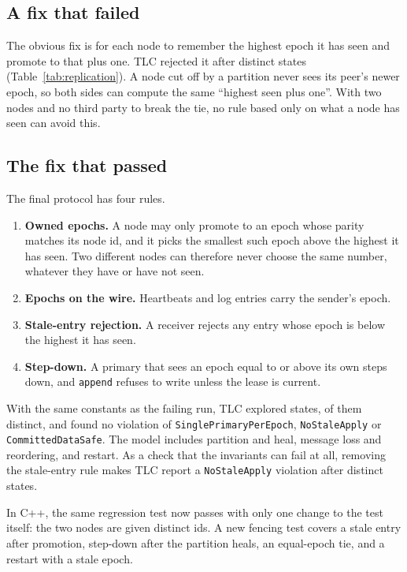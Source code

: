 

\subsection{A fix that failed}
The obvious fix is for each node to remember the highest epoch it has seen and promote to that plus one. TLC rejected it after \TlaFirstFixDistinct{} distinct states (Table~\ref{tab:replication}). A node cut off by a partition never sees its peer's newer epoch, so both sides can compute the same ``highest seen plus one''. With two nodes and no third party to break the tie, no rule based only on what a node has seen can avoid this.

\subsection{The fix that passed}
The final protocol has four rules.
\begin{enumerate}
\item \textbf{Owned epochs.} A node may only promote to an epoch whose parity matches its node id, and it picks the smallest such epoch above the highest it has seen. Two different nodes can therefore never choose the same number, whatever they have or have not seen.
\item \textbf{Epochs on the wire.} Heartbeats and log entries carry the sender's epoch.
\item \textbf{Stale-entry rejection.} A receiver rejects any entry whose epoch is below the highest it has seen.
\item \textbf{Step-down.} A primary that sees an epoch equal to or above its own steps down, and \texttt{append} refuses to write unless the lease is current.
\end{enumerate}

With the same constants as the failing run, TLC explored \TlaEnginePrimaryBackupGenerated{} states, \TlaEnginePrimaryBackupDistinct{} of them distinct, and found no violation of \texttt{SinglePrimaryPerEpoch}, \texttt{NoStaleApply} or \texttt{CommittedDataSafe}. The model includes partition and heal, message loss and reordering, and restart. As a check that the invariants can fail at all, removing the stale-entry rule makes TLC report a \texttt{NoStaleApply} violation after \TlaNoRuleDDistinct{} distinct states.

In C++, the same regression test now passes with only one change to the test itself: the two nodes are given distinct ids. A new fencing test covers a stale entry after promotion, step-down after the partition heals, an equal-epoch tie, and a restart with a stale epoch.

